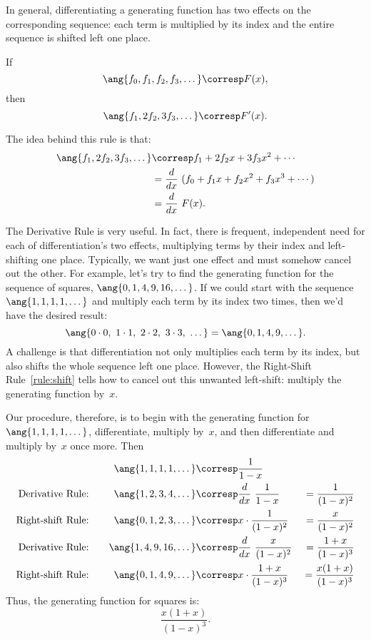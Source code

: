 In general, differentiating a generating function has two effects on
the corresponding sequence: each term is multiplied by its index and
the entire sequence is shifted left one place.

\begin{rul}
\label{rule:derivative}
If
\[
\ang{f_0, f_1, f_2, f_3, \dots} \corresp F(x),
\]
then
%
\[
\ang{f_1, 2f_2, 3f_3, \dots} \corresp F'(x).
\]
\end{rul}

The idea behind this rule is that:
\begin{align*}
\ang{f_1, 2f_2, 3f_3, \dots}
    & \corresp f_1 + 2 f_2 x + 3 f_3 x^2 + \cdots \\
    & = \frac{d}{dx} \ (f_0 + f_1 x + f_2 x^2 + f_3 x^3 + \cdots) \\
    & = \frac{d}{dx} \ F(x).
\end{align*}

The Derivative Rule is very useful.  In fact, there is frequent,
independent need for each of differentiation's two effects,
multiplying terms by their index and left-shifting one place.
Typically, we want just one effect and must somehow cancel out the
other.  For example, let's try to find the generating function for the
sequence of squares, $\ang{0, 1, 4, 9, 16, \dots}$.  If we could
start with the sequence $\ang{1, 1, 1, 1, \dots}$ and multiply each term by
its index two times, then we'd have the desired result:
%
\[
\ang{0 \cdot 0,\ 1 \cdot 1,\ 2 \cdot 2,\ 3 \cdot 3,\ \dots}
=
\ang{0, 1, 4, 9, \dots}.
\]
%
A challenge is that differentiation not only multiplies each term by
its index, but also shifts the whole sequence left one place.
However, the Right-Shift Rule~\ref{rule:shift} tells how to cancel out
this unwanted left-shift: multiply the generating function by~$x$.

Our procedure, therefore, is to begin with the generating function for
$\ang{1, 1, 1, 1, \dots}$, differentiate, multiply by~$x$, and then
differentiate and multiply by~$x$ once more.  Then
%
\begingroup
{}
\begin{alignat*}{3}
&\quad&
\ang{1, 1, 1, 1, \dots}  & \corresp \frac{1}{1-x}
&\enskip& \\
\text{Derivative Rule:} &&
\ang{1, 2, 3, 4, \dots}  & \corresp \frac{d}{dx} \ \frac{1}{1-x}
                                          &{}= \frac{1}{(1-x)^2}\\
\text{Right-shift Rule:} &&
\ang{0, 1, 2, 3, \dots}  & \corresp x \cdot \frac{1}{(1-x)^2}
                                          &{}= \frac{x}{(1-x)^2}\\
\text{Derivative Rule:} &&
\ang{1, 4, 9, 16, \dots} & \corresp \frac{d}{dx} \ \frac{x}{(1-x)^2}
                                          &{}= \frac{1+x}{(1-x)^3} \\
\text{Right-shift Rule:} &&
\ang{0, 1, 4, 9, \dots}  & \corresp x \cdot \frac{1+x}{(1-x)^3}
                                          &{}= \frac{x(1+x)}{(1-x)^3}
\end{alignat*}
\endgroup
%
Thus, the generating function for squares is:
%
\begin{equation}\label{squares_gen_func}
    \frac{x(1+x)}{(1-x)^3}.
\end{equation}

